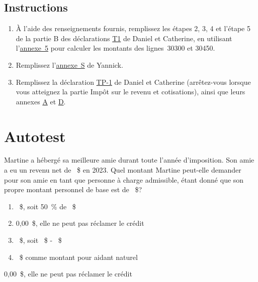 \subsection{Instructions}
\begin{enumerate}
	\item À l'aide des renseignements fournis, remplissez les étapes 2, 3, 4 et l'étape 5 de la partie B des déclarations \href{https://www.canada.ca/fr/agence-revenu/services/formulaires-publications/trousses-impot-toutes-annees-imposition/trousse-generale-impot-prestations/quebec/5005-r.html}{T1} de Daniel et Catherine, en utilisant l'\href{https://www.canada.ca/fr/agence-revenu/services/formulaires-publications/trousses-impot-toutes-annees-imposition/trousse-generale-impot-prestations/5000-s5.html}{annexe~5} pour calculer les montants des lignes~30300 et 30450.
	\item Remplissez l'\href{https://www.revenuquebec.ca/documents/fr/formulaires/tp/2023-12/TP-1.D.S%282023-12%29.pdf}{annexe~S} de Yannick.
	\item Remplissez la déclaration \href{https://www.revenuquebec.ca/documents/fr/formulaires/tp/2023-12/TP-1.D%282023-12%29.pdf}{TP-1} de Daniel et Catherine (arrêtez-vous lorsque vous atteignez la partie Impôt sur le revenu et cotisations), ainsi que leurs annexes \href{https://www.revenuquebec.ca/documents/fr/formulaires/tp/2023-12/TP-1.D.A%282023-12%29.pdf}{A} et \href{https://www.revenuquebec.ca/documents/fr/formulaires/tp/2023-12/TP-1.D.D%282023-12%29.pdf}{D}.
\end{enumerate}



\section{Autotest }
\setcounter{question}{0}
\begin{question}
	Martine a hébergé sa meilleure amie durant toute l'année d'imposition. Son amie a eu un revenu net de ~\$ en 2023. Quel montant Martine peut-elle demander pour son amie en tant que personne à charge admissible, étant donné que son propre montant personnel de base est de ~\$?
	\begin{enumerate}
		\item 	{}~\$, soit 50~\% de ~\$
		\item 	0,00~\$, elle ne peut pas réclamer le crédit
		\item 	{}~\$, soit ~\$ - ~\$
		\item 	{}~\$ comme montant pour aidant naturel
	\end{enumerate}
\end{question}
0,00~\$, elle ne peut pas réclamer le crédit

